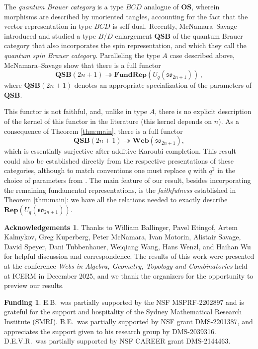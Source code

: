 \documentclass[10pt]{amsart}
\numberwithin{equation}{section}
\theoremstyle{definition}
\newtheorem*{ack}{Acknowledgements}
\newtheorem*{fund}{Funding}
\newcommand{\son}[1][2n+1]{\mathfrak{so}_{#1}}
\newcommand{\Rep}{\mathbf{Rep}}
\newcommand{\FRep}{\mathbf{FundRep}}
\newcommand{\Web}{\mathbf{Web}}
\begin{document}
The \emph{quantum Brauer category} is a type $BCD$ analogue of $\mathbf{OS}$, 
wherein morphisms are described by unoriented tangles,
accounting for the fact that the vector representation in type $BCD$ is self-dual. 
Recently, McNamara--Savage \cite{MS-qspin} introduced and studied a type $B/D$ 
enlargement $\mathbf{QSB}$ of the quantum Brauer category that also incorporates the spin representation, 
and which they call the \emph{quantum spin Brauer category}. 
Paralleling the type $A$ case described above, 
McNamara--Savage show that there is a full functor
\begin{equation}\label{eq:MSfunctor}
\mathbf{QSB}(2n+1) \twoheadrightarrow \FRep(U_q(\son)) \, ,
\end{equation}
where $\mathbf{QSB}(2n+1)$ denotes an appropriate specialization of the parameters of $\mathbf{QSB}$.

This functor is not faithful, and, unlike in type $A$, 
there is no explicit description of the kernel of this functor in the literature (this kernel depends on $n$).
As a consequence of Theorem \ref{thm:main}, there is a full functor 
\[
\mathbf{QSB}(2n+1) \twoheadrightarrow \Web(\son), 
\]
which is essentially surjective after additive Karoubi completion. 
This result could also be established directly from the respective presentations of these categories, 
although to match conventions one must replace $q$ with $q^2$ 
in the choice of parameters from \cite[Section 6]{MS-qspin}.
The main feature of our result, besides incorporating the remaining fundamental representations, 
is the \emph{faithfulness} established in Theorem \ref{thm:main}: 
we have all the relations needed to exactly describe $\Rep(U_q(\son))$.

\begin{ack}
Thanks to 
William Ballinger, 
Pavel Etingof, 
Artem Kalmykov,
Greg Kuperberg,
Peter McNamara, 
Ivan Motorin, 
Alistair Savage, 
David Speyer, 
Dani Tubbenhauer,
Weiqiang Wang, 
Hans Wenzl, 
and Haihan Wu 
for helpful discussion and correspondence.
The results of this work were presented at the conference 
\emph{Webs in Algebra, Geometry, Topology and Combinatorics}
held at ICERM in December 2025, 
and we thank the organizers for the opportunity to preview our results.
\end{ack}

\begin{fund}
E.B.~was partially supported by the NSF MSPRF-2202897 
and is grateful for the support and hospitality of the Sydney Mathematical Research Institute (SMRI). 
B.E.~was partially supported by NSF grant DMS-2201387, 
and appreciates the support given to his research group by DMS-2039316.
D.E.V.R.~was partially supported by NSF CAREER grant DMS-2144463.
\end{fund}
\end{document}
